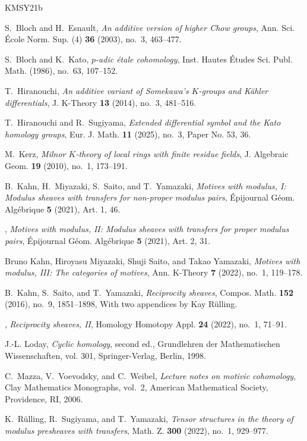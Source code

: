 \documentclass[a4paper,12pt,reqno]{amsart}
\numberwithin{equation}{section}
\theoremstyle{definition}
\begin{document}
\begin{thebibliography}{KMSY21b}

S.~Bloch and H.~Esnault, \emph{An additive version of higher {C}how groups},
  Ann. Sci. \'{E}cole Norm. Sup. (4) \textbf{36} (2003), no.~3, 463--477.

S.~Bloch and K.~Kato, \emph{{$p$}-adic \'etale cohomology}, Inst. Hautes
  \'Etudes Sci. Publ. Math. (1986), no.~63, 107--152.

T.~Hiranouchi, \emph{An additive variant of {S}omekawa's {$K$}-groups and
  {K}\"{a}hler differentials}, J. K-Theory \textbf{13} (2014), no.~3, 481--516.

T.~Hiranouchi and R.~Sugiyama, \emph{Extended differential symbol and the
  {K}ato homology groups}, Eur. J. Math. \textbf{11} (2025), no.~3, Paper No.
  53, 36.

M.~Kerz, \emph{Milnor {$K$}-theory of local rings with finite residue fields},
  J. Algebraic Geom. \textbf{19} (2010), no.~1, 173--191.

B.~Kahn, H.~Miyazaki, S.~Saito, and T.~Yamazaki, \emph{Motives with modulus,
  {I}: {M}odulus sheaves with transfers for non-proper modulus pairs},
  \'Epijournal G\'eom. Alg\'ebrique \textbf{5} (2021), Art. 1, 46.

\bysame, \emph{Motives with modulus, {II}: {M}odulus sheaves with transfers for
  proper modulus pairs}, \'Epijournal G\'eom. Alg\'ebrique \textbf{5} (2021),
  Art. 2, 31.

Bruno Kahn, Hiroyasu Miyazaki, Shuji Saito, and Takao Yamazaki, \emph{Motives
  with modulus, {III}: {T}he categories of motives}, Ann. K-Theory \textbf{7}
  (2022), no.~1, 119--178. 

B.~Kahn, S.~Saito, and T.~Yamazaki, \emph{Reciprocity sheaves}, Compos. Math.
  \textbf{152} (2016), no.~9, 1851--1898, With two appendices by Kay
  R\"{u}lling.

\bysame, \emph{Reciprocity sheaves, {II}}, Homology Homotopy Appl. \textbf{24}
  (2022), no.~1, 71--91.

J.-L. Loday, \emph{Cyclic homology}, second ed., Grundlehren der Mathematischen
  Wissenschaften, vol. 301, Springer-Verlag, Berlin, 1998.

C.~Mazza, V.~Voevodsky, and C.~Weibel, \emph{Lecture notes on motivic
  cohomology}, Clay Mathematics Monographs, vol.~2, American Mathematical
  Society, Providence, RI, 2006.

K.~R\"{u}lling, R.~Sugiyama, and T.~Yamazaki, \emph{Tensor structures in the
  theory of modulus presheaves with transfers}, Math. Z. \textbf{300} (2022),
  no.~1, 929--977.

\end{thebibliography}
\end{document}

